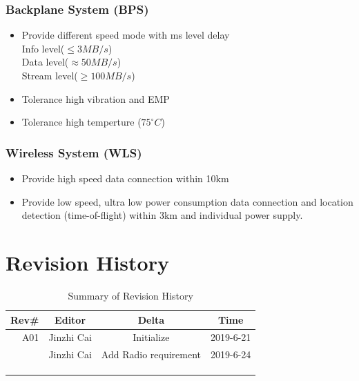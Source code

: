 \documentclass[12pt,article]{memoir}
\begin{document}
\subsection{Backplane System (BPS)}
\begin{itemize}
\item Provide different speed mode with ms level delay \\
Info level($\leq 3MB/s$)\\
Data level($\approx 50MB/s$)\\
Stream level($\geq 100MB/s$)
\item Tolerance high vibration and EMP
\item Tolerance high temperture (\leq $75^{\circ}C$)
\end{itemize}
\subsection{Wireless System (WLS)}
\begin{itemize}
\item Provide high speed data connection within 10km
\item Provide low speed, ultra low power consumption data connection and location detection (time-of-flight) within 3km and individual power supply.
\end{itemize}
\chapter{Revision History}
\begin{table}[H]
	\centering
	\begin{tabu}{r || c | c | c }
		Rev\# & Editor & Delta & Time\\ \hline
		A01 & Jinzhi Cai & Initialize  & 2019-6-21 \\
		 & Jinzhi Cai & Add Radio requirement & 2019-6-24 \\ \hline
		 & & & \\
		 & & & \\
		 & & & \\
	\end{tabu}
	\caption{Summary of Revision History}
	\label{tab:edatools}
\end{table}

\end{document}
